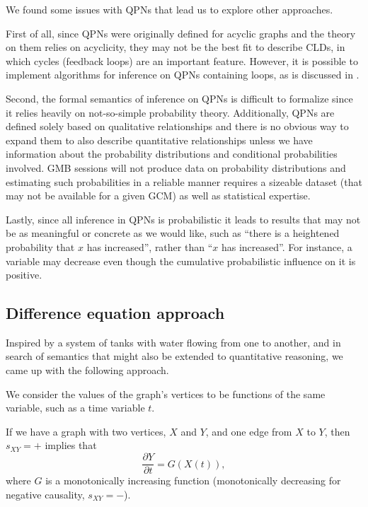 We found some issues with QPNs that lead us to explore other
approaches.

First of all, since QPNs were originally defined for acyclic graphs
and the theory on them relies on acyclicity, they may not be the best
fit to describe CLDs, in which cycles (feedback loops) are an
important feature. However, it is possible to implement algorithms for inference
on QPNs containing loops, as is discussed in \cite{vanKouwen}.


Second, the formal semantics of inference on QPNs is difficult to
formalize since it relies heavily on not-so-simple probability theory.
%
Additionally, QPNs are defined solely based on qualitative
relationships and there is no obvious way to expand them to also
describe quantitative relationships unless we have information about
the probability distributions and conditional probabilities involved.
%
GMB sessions will not produce data on probability distributions and
estimating such probabilities in a reliable manner requires a sizeable
dataset (that may not be available for a given GCM) as well as
statistical expertise.

Lastly, since all inference in QPNs is probabilistic it leads to
results that may not be as meaningful or concrete as we would like,
such as ``there is a heightened probability that $x$ has increased'',
rather than ``$x$ has increased''.
%
For instance, a variable may decrease even though the cumulative
probabilistic influence on it is positive.

\subsection{Difference equation approach}

Inspired by a system of tanks with water flowing from one to another,
and in search of semantics that might also be extended to quantitative
reasoning, we came up with the following approach.

We consider the values of the graph's vertices to be functions of the
same variable, such as a time variable $t$.

If we have a graph with two vertices, $X$ and $Y$, and one edge from
$X$ to $Y$, then $s_{XY}=+$ implies that
%
\[\frac{\partial Y}{\partial t} = G(X(t)),\]
%
where $G$ is a monotonically increasing function (monotonically decreasing for negative
causality, $s_{XY}=-$).

